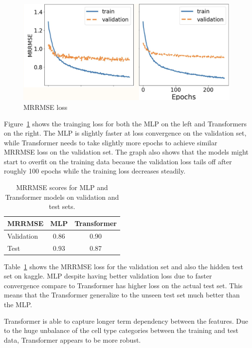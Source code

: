 \documentclass[11pt, oneside]{article}   	%
\begin{document}
\begin{figure}[htbp]
  \centering
  \includegraphics[width=1.0 \textwidth]{training.png}
  \caption{MRRMSE loss}
  \label{fig:training}
\end{figure}

Figure~\ref{fig:training} shows the trainging loss for both the MLP on the left and Transformers on the right. The MLP is slightly faster at loss convergence on the validation set, while Transformer needs to take slightly more epochs to achieve similar MRRMSE loss on the validation set. The graph also shows that the models might start to overfit on the training data because the validation loss tails off after roughly 100 epochs while the training loss decreases steadily. 

\begin{table}[htbp]
\centering
\begin{tabular}{|l|c|c|}
\hline
\textbf{MRRMSE} & \textbf{MLP} & \textbf{Transformer} \\
\hline
Validation & 0.86 & 0.90 \\
\hline
Test       & 0.93 & 0.87 \\
\hline
\end{tabular}
\caption{MRRMSE scores for MLP and Transformer models on validation and test sets.}
\label{tab:mrrmse_results}
\end{table}

Table~\ref{tab:mrrmse_results} shows the MRRMSE loss for the validation set and also the hidden test set on kaggle. MLP despite having better validation loss due to faster convergence compare to Transformer has higher loss on the actual test set. This means that the Transformer generalize to the unseen test set much better than the MLP. 

Transformer is able to capture longer term dependency between the features. Due to the huge unbalance of the cell type categories between the training and test data, Transformer appears to be more robust. 
\end{document}
